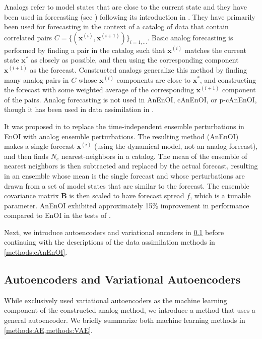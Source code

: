 \documentclass[final,3p]{elsarticle}
\theoremstyle{break}
\newcommand{\bb}[1]{\mathbf{#1}}
\begin{document}
Analogs refer to model states that are close to the current state and they have been used in forecasting (see \cite{delle2013probabilistic,eckel2016hybrid,zhao2016analog,van2003performance}) following its introduction in \cite{lorenz1969atmospheric}.
They have primarily been used for forecasting in the context of a catalog of data that contain correlated pairs $C=\{(\bb{x}^{(i)},\bb{x}^{(i+1)})\}_{i=1,...}$.
Basic analog forecasting is performed by finding a pair in the catalog such that $\bb{x}^{(i)}$ matches the current state $\bm{x}^*$ as closely as possible, and then using the corresponding component $\bb{x}^{(i+1)}$ as the forecast.
Constructed analogs generalize this method by finding many analog pairs in $C$ whose $\bb{x}^{(i)}$ components are close to $\bb{x}^*$, and constructing the forecast with some weighted average of the corresponding $\bb{x}^{(i+1)}$ component of the pairs.
Analog forecasting is not used in AnEnOI, cAnEnOI, or p-cAnEnOI, though it has been used in data assimilation in \cite{lguensat2017analog}.\par

It was proposed in \cite{grooms2020analog} to replace the time-independent ensemble perturbations in EnOI with analog ensemble perturbations.
The resulting method (AnEnOI) makes a single forecast $\bm{x}^{(i)}$ (using the dynamical model, not an analog forecast), and then finds $N_e$ nearest-neighbors in a catalog.
The mean of the ensemble of nearest neighbors is then subtracted and replaced by the actual forecast, resulting in an ensemble whose mean is the single forecast and whose perturbations are drawn from a set of model states that are similar to the forecast.
The ensemble covariance matrix $\bb{B}$ is then scaled to have forecast spread $f$, which is a tunable parameter. 
AnEnOI exhibited approximately 15\% improvement in performance compared to EnOI in the tests of \cite{grooms2020analog}. \par

Next, we introduce autoencoders and variational encoders in \cref{methods:ML} before continuing with the descriptions of the data assimilation methods in \cref{methods:cAnEnOI}.


\subsection{Autoencoders and Variational Autoencoders}
\label{methods:ML}
While \cite{grooms2020analog} exclusively used variational autoencoders as the machine learning component of the constructed analog method, we introduce a method that uses a general autoencoder.
We briefly summarize both machine learning methods in \cref{methods:AE,methods:VAE}.
\end{document}

